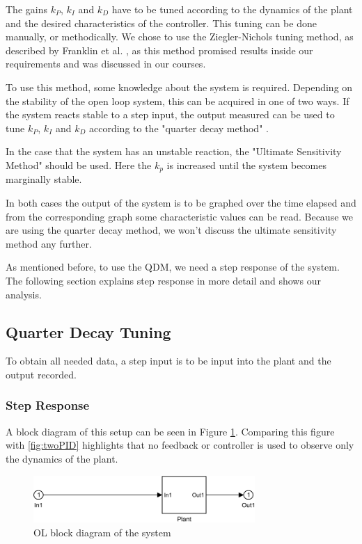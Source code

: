 The gains $k_P$, $k_I$ and $k_D$ have to be tuned according to the dynamics of the plant
and the desired characteristics of the controller.
This tuning can be done manually,
or methodically.
We chose to use the Ziegler-Nichols tuning method,
as described by Franklin et al. \cite{Franklin2014},
as this method promised results inside our requirements and was discussed in our courses.

To use this method, some knowledge about the system is required.
Depending on the stability of the open loop system,
this can be acquired in one of two ways.
If the system reacts stable to a step input,
the output measured can be used to tune $k_P$, $k_I$ and $k_D$ according to the "quarter decay method"
\cite{Franklin2014}.

In the case that the system has an unstable reaction,
the "Ultimate Sensitivity Method" should be used.
Here the $k_p$ is increased until the system becomes marginally stable.

In both cases the output of the system is to be graphed over the time elapsed
and from the corresponding graph some characteristic values can be read.
Because we are using the quarter decay method,
we won't discuss the ultimate sensitivity method any further.

As mentioned before,
to use the QDM, we need a step response of the system.
The following section explains step response in more detail and shows our analysis.

\subsection{Quarter Decay Tuning}
To obtain all needed data,
a step input is to be input into the plant
and the output recorded.
\subsubsection{Step Response}
A block diagram of this setup can be seen in Figure \ref{fig:OL}.
Comparing this figure with \ref{fig:twoPID} highlights
that no feedback or controller is used to observe only the dynamics of the plant.

\begin{figure}[H]
    \centering
    \includegraphics[width=0.75\textwidth]{figures/07controllerDesign/OLblock.pdf}
    \caption{OL block diagram of the system}
\label{fig:OL}
\end{figure}

